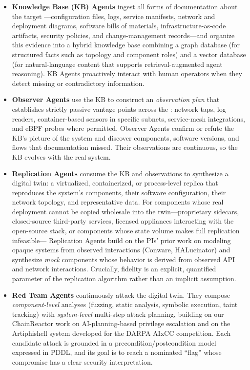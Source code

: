 \begin{itemize}[leftmargin=1.3em,itemsep=0.15em,topsep=0.3em]
  \item \textbf{Knowledge Base (KB) Agents} ingest all forms of
  documentation about the target \cps---configuration files, logs,
  service manifests, network and deployment diagrams, software bills
  of materials, infrastructure-as-code artifacts, security policies,
  and change-management records---and organize this evidence into a hybrid
  knowledge base combining a graph database (for structured facts such
  as topology and component roles) and a vector database (for
  natural-language content that supports retrieval-augmented agent
  reasoning). KB Agents proactively interact with human operators when
  they detect missing or contradictory information.

  \item \textbf{Observer Agents} use the KB to construct an
  \emph{observation plan} that establishes strictly passive vantage
  points across the \cps: network taps, log readers, container-based
  sensors in specific subnets, service-mesh integrations, and eBPF
  probes where permitted. Observer Agents confirm or refute the KB's
  picture of the system and discover components, software versions,
  and flows that documentation missed. Their observations are
  continuous, so the KB evolves with the real system.

  \item \textbf{Replication Agents} consume the KB and observations to
  synthesize a digital twin: a virtualized, containerized, or
  process-level replica that reproduces the system's components, their
  software configuration, their network topology, and representative
  data. For components whose real deployment cannot be copied wholesale
  into the twin---proprietary sidecars, closed-source third-party
  services, licensed appliances interacting with the open-source stack,
  or components whose state volume makes full replication infeasible---
  Replication Agents build on the PIs' prior work on modeling opaque
  systems from observed interactions (Conware, HALucinator) and
  synthesize \emph{mock} components whose behavior is derived from
  observed API and network interactions. Crucially,
  fidelity is an explicit, quantified parameter of the replication
  algorithm rather than an implicit assumption.

  \item \textbf{Red Team Agents} continuously attack the digital twin.
  They compose \emph{component-level} analyses (fuzzing, static
  analysis, symbolic execution, taint tracking) with \emph{system-level}
  multi-step attack planning, building on our ChainReactor work on
  AI-planning-based privilege escalation and on the Artiphishell system
  developed for the DARPA AIxCC competition. Each candidate attack is
  grounded in a precondition/postcondition model expressed in PDDL, and
  its goal is to reach a nominated ``flag'' whose compromise has a
  clear security interpretation.
\end{itemize}

